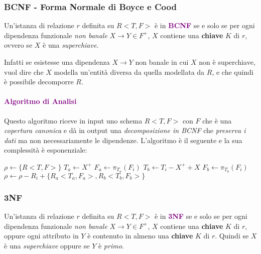\subsubsection{BCNF - Forma Normale di Boyce e Cood}

\begin{definition}[BCNF]
    Un'istanza di relazione $r$ definita su $R<T,F>$ è in \textbf{\textcolor{purple}{BCNF}}
    se e solo se per ogni dipendenza funzionale \emph{non banale} $X \rightarrow Y \in F^+$, $X$
    contiene una \textbf{chiave} $K$ di $r$, ovvero se $X$ è una \emph{superchiave}.

    Infatti se esistesse una dipendenza $X \rightarrow Y$ non banale in cui
    $X$ non è superchiave, vuol dire che $X$ modella un'entità diversa
    da quella modellata da $R$, e che quindi è possibile decomporre $R$.
\end{definition}

\paragraph{\textcolor{purple}{Algoritmo di Analisi}} Questo algoritmo riceve in
input uno schema $R<T,F>$ con $F$ che è una \emph{copertura canonica} e dà in output
una \emph{decomposizione in BCNF} che \emph{preserva i dati} ma non necessariamente le
dipendenze. L'algoritmo è il seguente e la sua complessità è esponenziale:

\begin{algorithm}
    \begin{algorithmic}
        \State $\rho \gets \{R<T,F>\}$
            \State $T_a \gets X^+$
            \State $F_a \gets \pi_{T_a}(F_i)$
            \State $T_b \gets T_i - X^+ + X$
            \State $F_b \gets \pi_{T_b}(F_i)$
            \State $\rho \gets \rho - R_i + \{R_a<T_a,F_a>, R_b<T_b,F_b>\}$
        \EndWhile
    \end{algorithmic}
\end{algorithm}

\subsubsection{3NF}

\begin{definition}[3NF]
    Un'istanza di relazione $r$ definita su $R<T,F>$ è in \textbf{\textcolor{purple}{3NF}}
    se e solo se per ogni dipendenza funzionale \emph{non banale} $X \rightarrow Y \in F^+$, $X$
    contiene una \textbf{chiave} $K$ di $r$, oppure ogni attributo in $Y$ è contenuto in almeno una
    \textbf{chiave} $K$ di $r$. Quindi se $X$ è una \emph{superchiave} oppure
    se $Y$ è \emph{primo}.
\end{definition}

